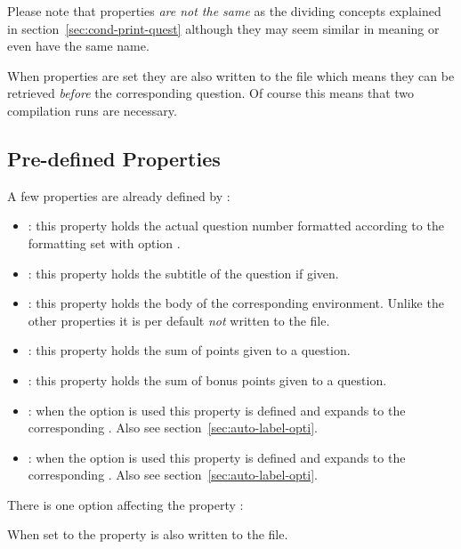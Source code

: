 \documentclass[load-preamble+]{cnltx-doc}
\begin{document}
Please note that properties \emph{are not the same} as the dividing concepts
explained in section~\ref{sec:cond-print-quest} although they may seem
similar in meaning or even have the same name.

When properties are set they are also written to the  file which
means they can be retrieved \emph{before} the corresponding question.  Of
course this means that two compilation runs are necessary.

\subsection{Pre-defined Properties}

A few properties are already defined by \ExSheets:
\begin{itemize}
  \item {}: this property holds the actual
    question number formatted according to the formatting set with option
    .
  \item {}: this property holds the subtitle
    of the question if given.
  \item {}: this property holds the body
    of the corresponding  environment.  Unlike the other
    properties it is per default \emph{not} written to the  file.
  \item {}: this property holds the sum of points given to a
    question.
  \item {}: this property holds the sum of
    bonus points given to a question.
  \item {}: when the option  is
    used this property is defined and expands to the corresponding .
    Also see section~\ref{sec:auto-label-opti}.
  \item {}: when the option
     is used this property is defined and expands to the
    corresponding .  Also see section~\ref{sec:auto-label-opti}.
\end{itemize}

There is one option affecting the property :
\begin{options}
    When set to  the property  is also written
    to the  file.
\end{options}
\end{document}

